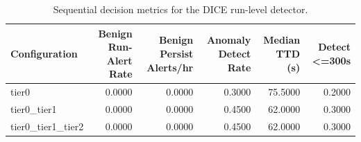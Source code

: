 \begin{table}[t]
\centering
\caption{Sequential decision metrics for the DICE run-level detector.}
\label{tab:dice_sequential_metrics}
\footnotesize
\begin{tabular}{lrrrrr}
\toprule
Configuration & Benign Run-Alert Rate & Benign Persist Alerts/hr & Anomaly Detect Rate & Median TTD (s) & Detect <=300s \\
\midrule
tier0 & 0.0000 & 0.0000 & 0.3000 & 75.5000 & 0.2000 \\
tier0_tier1 & 0.0000 & 0.0000 & 0.4500 & 62.0000 & 0.3000 \\
tier0_tier1_tier2 & 0.0000 & 0.0000 & 0.4500 & 62.0000 & 0.3000 \\
\bottomrule
\end{tabular}

\end{table}
